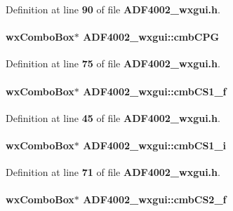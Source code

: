 Definition at line {\bf 90} of file {\bf A\+D\+F4002\+\_\+wxgui.\+h}.

\paragraph[{cmb\+C\+PG}]{\setlength{\rightskip}{0pt plus 5cm}wx\+Combo\+Box$\ast$ A\+D\+F4002\+\_\+wxgui\+::cmb\+C\+PG}\label{classADF4002__wxgui_a176eba696809d50b9b94aff797c47f0d}


Definition at line {\bf 75} of file {\bf A\+D\+F4002\+\_\+wxgui.\+h}.

\paragraph[{cmb\+C\+S1\+\_\+f}]{\setlength{\rightskip}{0pt plus 5cm}wx\+Combo\+Box$\ast$ A\+D\+F4002\+\_\+wxgui\+::cmb\+C\+S1\+\_\+f}\label{classADF4002__wxgui_a6bad6efbf92a59429470c8a587442090}


Definition at line {\bf 45} of file {\bf A\+D\+F4002\+\_\+wxgui.\+h}.

\paragraph[{cmb\+C\+S1\+\_\+i}]{\setlength{\rightskip}{0pt plus 5cm}wx\+Combo\+Box$\ast$ A\+D\+F4002\+\_\+wxgui\+::cmb\+C\+S1\+\_\+i}\label{classADF4002__wxgui_a344e2698b8459d9ae3c4cbffdb7b3dd0}


Definition at line {\bf 71} of file {\bf A\+D\+F4002\+\_\+wxgui.\+h}.

\paragraph[{cmb\+C\+S2\+\_\+f}]{\setlength{\rightskip}{0pt plus 5cm}wx\+Combo\+Box$\ast$ A\+D\+F4002\+\_\+wxgui\+::cmb\+C\+S2\+\_\+f}\label{classADF4002__wxgui_a890f93942521bd435ca037653f6b79c3}


